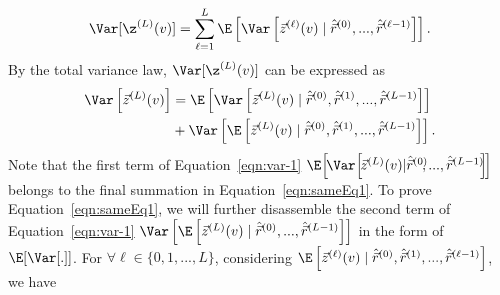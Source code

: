 \begin{equation}\label{eqn:sameEq1}
\Var[\z^{(L)}(v)]= \sum_{\ell=1}^{L} \E \left[ \Var \left[\vec{z}^{(\ell)}(v)\mid \hat{\vec{r}}^{(0)},...,\hat{\vec{r}}^{(\ell-1)}\right]\right]. 
\end{equation}
By the total variance law, $\Var[\z^{(L)}(v)]$ can be expressed as
\begin{equation}\label{eqn:var-1}
\begin{aligned}
\Var \left[ \vec{z}^{(L)}(v)\right]
&= \E \left[ \Var \left[\vec{z}^{(L)}(v) \mid \hat{\vec{r}}^{(0)},\hat{\vec{r}}^{(1)},...,\hat{\vec{r}}^{(L-1)}\right]\right]\\
&+\Var \left[ \E \left[\vec{z}^{(L)}(v) \mid \hat{\vec{r}}^{(0)},\hat{\vec{r}}^{(1)},...,\hat{\vec{r}}^{(L-1)}\right] \right]. 
\end{aligned}
\end{equation}
Note that the first term of Equation~\eqref{eqn:var-1} $\E \hspace{-0.5mm}\left[\hspace{-0.5mm} \Var \hspace{-0.5mm}\left[\hspace{-0.5mm}\vec{z}^{(L)}(v) \hspace{-1mm}\mid \hspace{-1mm} \hat{\vec{r}}^{(0)}\hspace{-1.5mm},...,\hat{\vec{r}}^{(L-1)}\hspace{-1mm}\right]\hspace{-0.5mm}\right]$ belongs to the final summation in Equation~\eqref{eqn:sameEq1}. To prove Equation~\eqref{eqn:sameEq1}, we will further disassemble the second term of Equation~\eqref{eqn:var-1} $\Var \left[ \E \left[\vec{z}^{(L)}(v) \mid \hat{\vec{r}}^{(0)},...,\hat{\vec{r}}^{(L-1)}\right] \right]$ in the form of $\E[\Var[.]]$. For $\forall \ell \in \{0,1,...,L\}$, considering $ \E \left[\vec{z}^{(\ell)}(v) \mid \hat{\vec{r}}^{(0)},\hat{\vec{r}}^{(1)},...,\hat{\vec{r}}^{(\ell-1)}\right] $, we have
